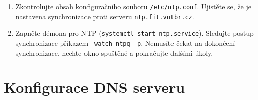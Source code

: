 \begin{enumerate}

  \item Zkontrolujte obsah konfiguračního souboru {\tt /etc/ntp.conf}. Ujistěte
    se, že je nastavena synchronizace proti serveru {\tt ntp.fit.vutbr.cz}.

  \item Zapněte démona pro NTP ({\tt systemctl start ntp.service}).
    Sledujte postup synchronizace příkazem {\tt
    watch ntpq -p}. Nemusíte čekat na dokončení synchronizace, nechte okno
    spuštěné a pokračujte dalšími úkoly.

\end{enumerate}

\section{Konfigurace DNS serveru}
